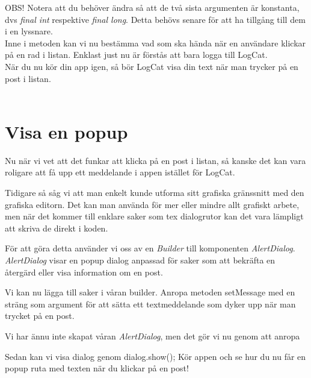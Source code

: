 \documentclass[11 pt]{article} %
\begin{document}
OBS! Notera att du behöver ändra så att de två sista argumenten är konstanta, dvs \textit{final int} respektive \textit{final long}. Detta behövs senare för att ha tillgång till dem i en lyssnare.\\

Inne i metoden kan vi nu bestämma vad som ska hända när en användare klickar på en rad i listan. Enklast just nu är förstås att bara logga till LogCat.\\

När du nu kör din app igen, så bör LogCat visa din text när man trycker på en post i listan.\\ \\
\section{Visa en popup}
Nu när vi vet att det funkar att klicka på en post i listan, så kanske det kan vara roligare att få upp ett meddelande i appen istället för LogCat.

Tidigare så såg vi att man enkelt kunde utforma sitt grafiska gränssnitt med den grafiska editorn. Det kan man använda för mer eller mindre allt grafiskt arbete, men när det kommer till enklare saker som tex dialogrutor kan det vara lämpligt att skriva de direkt i koden.

För att göra detta använder vi oss av en \textit{Builder} till komponenten \textit{AlertDialog}. \textit{AlertDialog} visar en popup dialog anpassad för saker som att bekräfta en återgärd eller visa information om en post.


Vi kan nu lägga till saker i våran builder. Anropa metoden setMessage med en sträng som argument för att sätta ett textmeddelande som dyker upp när man trycket på en post.

Vi har ännu inte skapat våran \textit{AlertDialog}, men det gör vi nu genom att anropa 

Sedan kan vi visa dialog genom dialog.show();
Kör appen och se hur du nu får en popup ruta med texten när du klickar på en post!\\ \\
\end{document}

